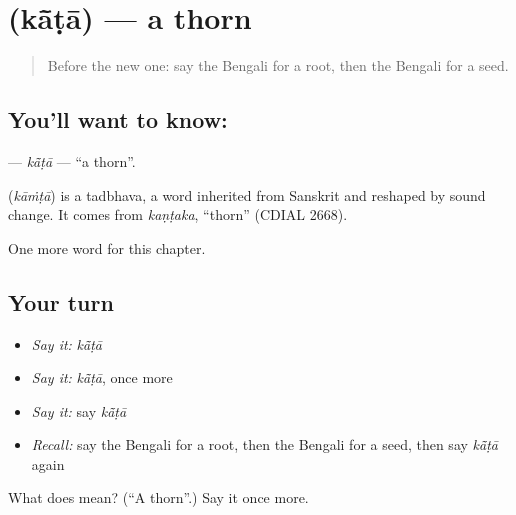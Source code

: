 \section[\texorpdfstring{\bn{কাঁটা} (kā̃ṭā)}{কাঁটা (kā̃ṭā)}]{ (kā̃ṭā) — a thorn}

\label{lesson:BN-C114-kata}



\begin{quote}
Before the new one: say the Bengali for a root, then the Bengali for a seed.
\end{quote}

\subsection*{You'll want to know: }
\textbf{} — \emph{kā̃ṭā} — \textquotedblleft{}a thorn\textquotedblright{}.

\begin{cousinweb}
\textbf{} (\emph{kāṁṭā}) is a tadbhava, a word inherited from Sanskrit and reshaped by sound change. It comes from \emph{kaṇṭaka}, \textquotedblleft{}thorn\textquotedblright{} (CDIAL 2668).
\end{cousinweb}

\begin{grammarlens}[title={What you've built}]
One more word for this chapter.
\end{grammarlens}

\subsection*{Your turn}
\begin{itemize}
\raggedright
  \item \emph{Say it:} \emph{kā̃ṭā}
  \item \emph{Say it:} \emph{kā̃ṭā}, once more
  \item \emph{Say it:} say \emph{kā̃ṭā}
  \item \emph{Recall:} say the Bengali for a root, then the Bengali for a seed, then say \emph{kā̃ṭā} again
\end{itemize}

\begin{tcolorbox}[breakable,colback=teal!4,colframe=teal!35!black,title={Before you move on}]
What does  mean? (\textquotedblleft{}A thorn\textquotedblright{}.) Say it once more.
\end{tcolorbox}
